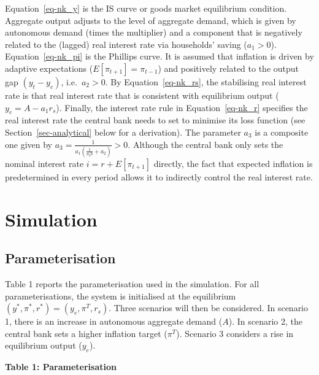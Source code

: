 \documentclass[
  letterpaper,
  DIV=11,
  numbers=noendperiod]{scrreprt}
\begin{document}
Equation~\ref{eq-nk_y} is the IS curve or goods market equilibrium
condition. Aggregate output adjusts to the level of aggregate demand,
which is given by autonomous demand (times the multiplier) and a
component that is negatively related to the (lagged) real interest rate
via households' saving (\(a_1>0\)). Equation~\ref{eq-nk_pi} is the
Phillips curve. It is assumed that inflation is driven by adaptive
expectations (\(E[\pi_{t+1}]=\pi_{t-1}\)) and positively related to the
output gap \((y_t-y_e)\), i.e.~\(a_2>0\). By Equation~\ref{eq-nk_rs},
the stabilising real interest rate is that real interest rate that is
consistent with equilibrium output (\(y_e=A -a_1r_s\)). Finally, the
interest rate rule in Equation~\ref{eq-nk_r} specifies the real interest
rate the central bank needs to set to minimise its loss function (see
Section~\ref{sec-analytical} below for a derivation). The parameter
\(a_3\) is a composite one given by
\(a_3 = \frac{1}{a_1(\frac{1}{a_2 b} + a_2)} >0\). Although the central
bank only sets the nominal interest rate \(i = r + E[\pi_{t+1}]\)
directly, the fact that expected inflation is predetermined in every
period allows it to indirectly control the real interest rate.

\section{Simulation}\label{simulation-6}

\subsection{Parameterisation}\label{parameterisation-6}

Table 1 reports the parameterisation used in the simulation. For all
parameterisations, the system is initialised at the equilibrium
\((y^*,\pi^*,r^*)=(y_e,\pi^T, r_s)\). Three scenarios will then be
considered. In scenario 1, there is an increase in autonomous aggregate
demand (\(A\)). In scenario 2, the central bank sets a higher inflation
target (\(\pi^T\)). Scenario 3 considers a rise in equilibrium output
(\(y_e\)).

\textbf{Table 1: Parameterisation}
\end{document}
